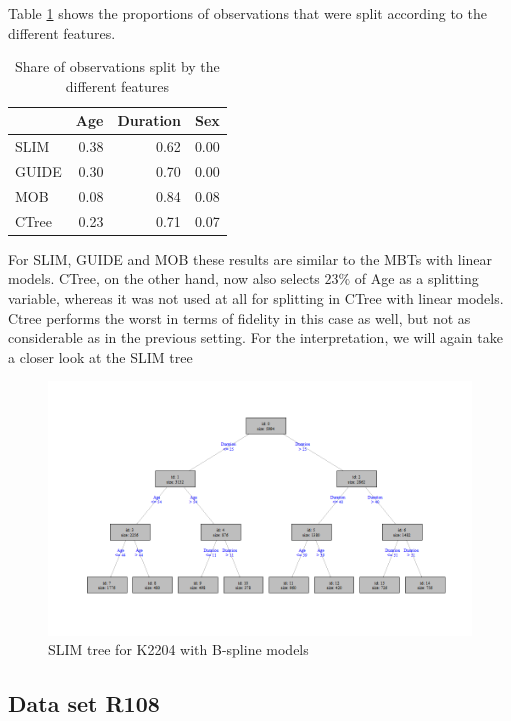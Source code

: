 Table \ref{tab:ins_k2204_bsplines_small_surrogates_share}  shows the proportions of observations that were split according to the different features. 


\begin{table}[!htb]
\caption{Share of observations split by the different features}
\centering
\begin{tabular}[t]{l|r|r|r}
\hline
  & Age & Duration & Sex\\
\hline
SLIM & 0.38 & 0.62 & 0.00\\
GUIDE & 0.30 & 0.70 & 0.00\\
MOB & 0.08 & 0.84 & 0.08\\
CTree & 0.23 & 0.71 & 0.07\\
\hline
\end{tabular}
\label{tab:ins_k2204_bsplines_small_surrogates_share}
\end{table}

For SLIM, GUIDE and MOB these results are similar to the MBTs with linear models. CTree, on the other hand, now also selects $23\%$ of Age as a splitting variable, whereas it was not used at all for splitting in CTree with linear models. Ctree performs the worst in terms of fidelity in this case as well, but not as considerable as in the previous setting.
For the interpretation, we will again take a closer look at the SLIM tree

\begin{figure}[!htb]
    \centering   
    \includegraphics[width = 16cm]{Figures/insurance_use_case/k2204_BPV/slim_bsplines_small_tree.png}
         \caption{SLIM tree for K2204 with B-spline models}
     \label{fig:ins_slim_bsplines_tree}
\end{figure}


\subsection{Data set R108}



